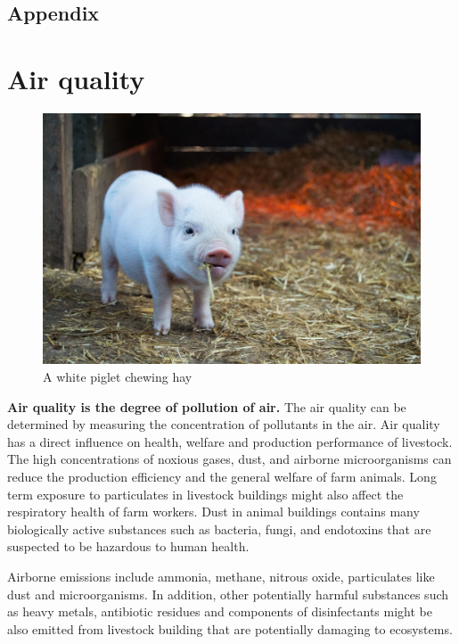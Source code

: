 \documentclass[]{book}
\begin{document}
\section{Appendix}\label{appendix-1}

\chapter{Air quality}\label{air-quality}

\begin{figure}

{\centering \includegraphics[width=1\linewidth,height=1\textheight]{figures/pig-straw} 

}

\caption{A white piglet chewing hay}\label{fig:pig-straw}
\end{figure}

\textbf{Air quality is the degree of pollution of air.} The air quality
can be determined by measuring the concentration of pollutants in the
air. Air quality has a direct influence on health, welfare and
production performance of livestock. The high concentrations of noxious
gases, dust, and airborne microorganisms can reduce the production
efficiency and the general welfare of farm animals. Long term exposure
to particulates in livestock buildings might also affect the respiratory
health of farm workers. Dust in animal buildings contains many
biologically active substances such as bacteria, fungi, and endotoxins
that are suspected to be hazardous to human health.

Airborne emissions include ammonia, methane, nitrous oxide, particulates
like dust and microorganisms. In addition, other potentially harmful
substances such as heavy metals, antibiotic residues and components of
disinfectants might be also emitted from livestock building that are
potentially damaging to ecosystems.
\end{document}
